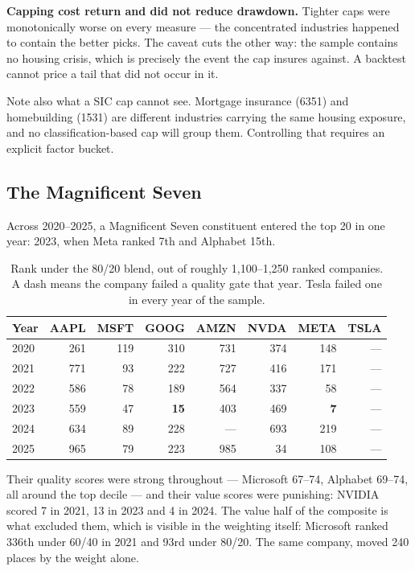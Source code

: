 \documentclass[11pt,a4paper]{article}
\newcommand{\keyfinding}[1]{%
  \par\vspace{0.4em}%
  \noindent\colorbox{ink!4}{\parbox{\dimexpr\linewidth-2\fboxsep}{\vspace{0.3em}#1\vspace{0.3em}}}%
  \par\vspace{0.4em}}
\begin{document}
\keyfinding{\textbf{Capping cost return and did not reduce drawdown.} Tighter
caps were monotonically worse on every measure --- the concentrated industries
happened to contain the better picks. The caveat cuts the other way: the sample
contains no housing crisis, which is precisely the event the cap insures
against. A backtest cannot price a tail that did not occur in it.}

Note also what a SIC cap cannot see. Mortgage insurance (6351) and homebuilding
(1531) are different industries carrying the same housing exposure, and no
classification-based cap will group them. Controlling that requires an explicit
factor bucket.

\subsection{The Magnificent Seven}

Across 2020--2025, a Magnificent Seven constituent entered the top 20 in one
year: 2023, when Meta ranked 7th and Alphabet 15th.

\begin{table}[h]
\centering
\sffamily\small
\begin{tabular}{@{}lrrrrrrr@{}}
\toprule
\textbf{Year} & \textbf{AAPL} & \textbf{MSFT} & \textbf{GOOG} & \textbf{AMZN} & \textbf{NVDA} & \textbf{META} & \textbf{TSLA}\\
\midrule
2020 & 261 & 119 & 310 & 731 & 374 & 148 & ---\\
2021 & 771 & 93 & 222 & 727 & 416 & 171 & ---\\
2022 & 586 & 78 & 189 & 564 & 337 & 58 & ---\\
2023 & 559 & 47 & \textbf{15} & 403 & 469 & \textbf{7} & ---\\
2024 & 634 & 89 & 228 & --- & 693 & 219 & ---\\
2025 & 965 & 79 & 223 & 985 & 34 & 108 & ---\\
\bottomrule
\end{tabular}
\caption{Rank under the 80/20 blend, out of roughly 1,100--1,250 ranked
companies. A dash means the company failed a quality gate that year. Tesla
failed one in every year of the sample.}
\end{table}

Their quality scores were strong throughout --- Microsoft 67--74, Alphabet
69--74, all around the top decile --- and their value scores were punishing:
NVIDIA scored 7 in 2021, 13 in 2023 and 4 in 2024. The value half of the
composite is what excluded them, which is visible in the weighting itself:
Microsoft ranked 336th under 60/40 in 2021 and 93rd under 80/20. The same
company, moved 240 places by the weight alone.
\end{document}
